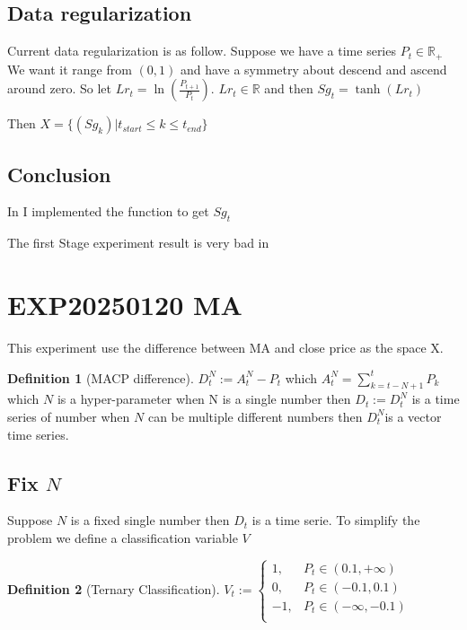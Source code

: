 \documentclass{article}
\theoremstyle{definition} %
\newtheorem{definition}{Definition}[section]
\begin{document}
\subsection{Data regularization}
Current data regularization is as follow.
Suppose we have a time series
$P_t \in \mathbb{R}_+$
We want it range from $(0,1)$ and have a symmetry
about descend and ascend around zero.
So let $Lr_t=\ln(\frac{P_{t+1}}{P_{t}})$.
$Lr_t\in \mathbb{R}$ and then
$Sg_t=\tanh(Lr_t)$

Then $X=\{(Sg_k)|t_{start}\leq k\leq t_{end}\}$

\subsection{Conclusion}
In \cite[PrefixSequence]{EXP20250119PrefixSequence}
I implemented the function to get $Sg_t$

The first Stage experiment result is
very bad in \cite[Cov1d]{EXP20250119PrefixSequenceGPTCov1d}

\section{EXP20250120 MA}
This experiment use the difference between
MA and close price as the space X.

\begin{definition}[MACP difference]
    $D_t^N:=A_t^N-P_t$
    which
    $A_t^N=\sum_{k=t-N+1}^tP_k$
    which $N$ is a hyper-parameter
    when N is a single number then $D_t:=D_t^N$
    is a time series of number
    when $N$ can be multiple different numbers
    then $D_t^N$is a vector time series.
\end{definition}

\subsection[Fix N]{Fix $N$}
Suppose $N$ is a fixed single number then
$D_t$ is a time serie.
To simplify the problem we define a
classification variable $V$
\begin{definition}[Ternary Classification]
    $
        V_t:=
        \begin{cases}
            1,  & P_t\in\left(0.1,+\infty\right)  \\
            0,  & P_t\in\left(-0.1,0.1\right)     \\
            -1, & P_t\in\left(-\infty,-0.1\right) \\
        \end{cases}
    $
\end{definition}
\end{document}
